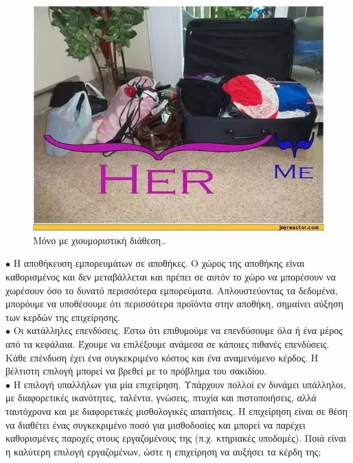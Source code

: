 \documentclass[12pt]{article}
\begin{document}
\begin{figure}
	\centering
	\includegraphics[scale=0.45]{./knapsack-example.png}
	\caption{Μόνο με χιουμοριστική διάθεση..}
\end{figure}

\(\bullet\) Η αποθήκευση εμπορευμάτων σε αποθήκες. Ο χώρος της αποθήκης είναι καθορισμένος και δεν μεταβάλλεται και πρέπει σε αυτόν το χώρο να μπορέσουν να χωρέσουν όσο το δυνατό περισσότερα εμπορεύματα. Απλουστεύοντας τα δεδομένα, μπορόυμε να υποθέσουμε ότι περισσότερα προϊόντα στην αποθήκη, σημαίνει αύξηση των κερδών της επιχείρησης. \\

\(\bullet\) Οι κατάλληλες επενδύσεις. Έστω  ότι επιθυμούμε να επενδύσουμε όλα ή ένα  μέρος  από τα κεφάλαια. Έχουμε να επιλέξουμε ανάμεσα  σε κάποιες πιθανές επενδύσεις. Κάθε επένδυση έχει ένα συγκεκριμένο κόστος και ένα αναμενόμενο κέρδος. Η βέλτιστη επιλογή μπορεί να βρεθεί με το πρόβλημα του σακιδίου. \\ 

\(\bullet\) Η επιλογή υπαλλήλων για μία επιχείρηση. Υπάρχουν πολλοί εν δυνάμει υπάλληλοι, με διαφορετικές ικανότητες, ταλέντα, γνώσεις, πτυχία και πιστοποιήσεις, αλλά ταυτόχρονα και με διαφορετικές μισθολογικές απαιτήσεις. Η επιχείρηση είναι σε θέση να διαθέτει ένας συγκεκριμένο ποσό για μισθοδοσίες και μπορεί να παρέχει καθορισμένες παροχές στους εργαζομένους της (π.χ. κτηριακές υποδομές). Ποιά είναι η καλύτερη επιλογή εργαζομένων, ώστε η επιχείρηση να αυξήσει τα κέρδη της; \\
\end{document}
